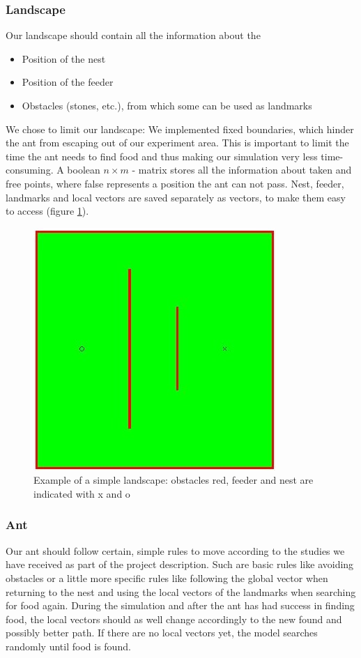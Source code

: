 \documentclass[11pt]{article}
\begin{document}
\subsubsection*{Landscape}
Our landscape should contain all the information about the
\begin{itemize}

\item Position of the nest
\item Position of the feeder
\item Obstacles (stones, etc.), from which some can be used as landmarks
\end{itemize}

We chose to limit our landscape: We implemented fixed boundaries, which hinder the ant from escaping out of our experiment area. This is important to limit the time the ant needs to find food and thus making our simulation very less time-consuming. A boolean $n \times m$ - matrix stores all the information about taken and free points, where false represents a position the ant can not pass. Nest, feeder, landmarks and local vectors are saved separately as vectors, to make them easy to access (figure \ref{fig1}).

\begin{figure}[h!]
   \centering
     \includegraphics[scale=0.6]{images/landscape.jpg}
     \caption[Example of a simple landscape]{Example of a simple landscape: obstacles red, feeder and nest are indicated with x and o}
\label{fig1}
\end{figure}

\subsubsection*{Ant}
Our ant should follow certain, simple rules to move according to the studies we have received as part of the project description\cite{wehner88,wehner98,wehner03}. Such are basic rules like avoiding obstacles or a little more specific rules like following the global vector when returning to the nest and using the local vectors of the landmarks when searching for food again. During the simulation and after the ant has had success in finding food, the local vectors should as well change accordingly to the new found and possibly better path. If there are no local vectors yet, the model searches randomly until food is found.
\end{document}
